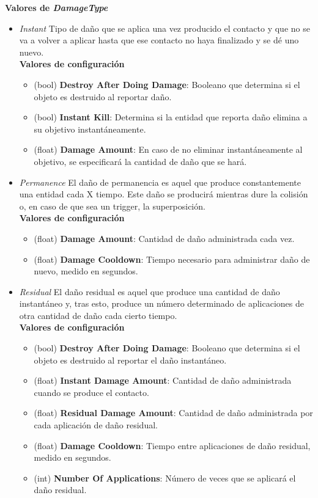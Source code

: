 \textbf{Valores de \textit{DamageType}}

\begin{itemize}
	\item \textit{Instant}
Tipo de daño que se aplica una vez producido el contacto y que no se va a volver a aplicar hasta que ese contacto no haya finalizado y se dé uno nuevo.\\

\textbf{Valores de configuración}
	\begin{itemize}
	        \item (bool) \textbf{Destroy After Doing Damage}: Booleano que determina si el objeto es destruido al reportar daño.
	        \item (bool) \textbf{Instant Kill}: Determina si la entidad que reporta daño elimina a su objetivo instantáneamente.
	        \item (float) \textbf{Damage Amount}: En caso de no eliminar instantáneamente al objetivo, se especificará la cantidad de daño que se hará.
	 \end{itemize}
	\item \textit{Permanence}
El daño de permanencia es aquel que produce constantemente una entidad cada X tiempo. Este daño se producirá mientras dure la colisión o, en caso de que sea un trigger, la superposición.\\

\textbf{Valores de configuración}
	\begin{itemize}
	        \item (float) \textbf{Damage Amount}: Cantidad de daño administrada cada vez.
	        \item (float) \textbf{Damage Cooldown}: Tiempo necesario para administrar daño de nuevo, medido en segundos.
	\end{itemize}

	\item \textit{Residual}
El daño residual es aquel que produce una cantidad de daño instantáneo y, tras esto, produce un número determinado de aplicaciones de otra cantidad de daño cada cierto tiempo.\\

\textbf{Valores de configuración}
	\begin{itemize}
	        \item (bool) \textbf{Destroy After Doing Damage}: Booleano que determina si el objeto es destruido al reportar el daño instantáneo.
	        \item (float) \textbf{Instant Damage Amount}: Cantidad de daño administrada cuando se produce el contacto.
	        \item (float) \textbf{Residual Damage Amount}: Cantidad de daño administrada por cada aplicación de daño residual.
	        \item (float) \textbf{Damage Cooldown}: Tiempo entre aplicaciones de daño residual, medido en segundos.
	        \item (int) \textbf{Number Of Applications}: Número de veces que se aplicará el daño residual.
	\end{itemize}
\end{itemize}

